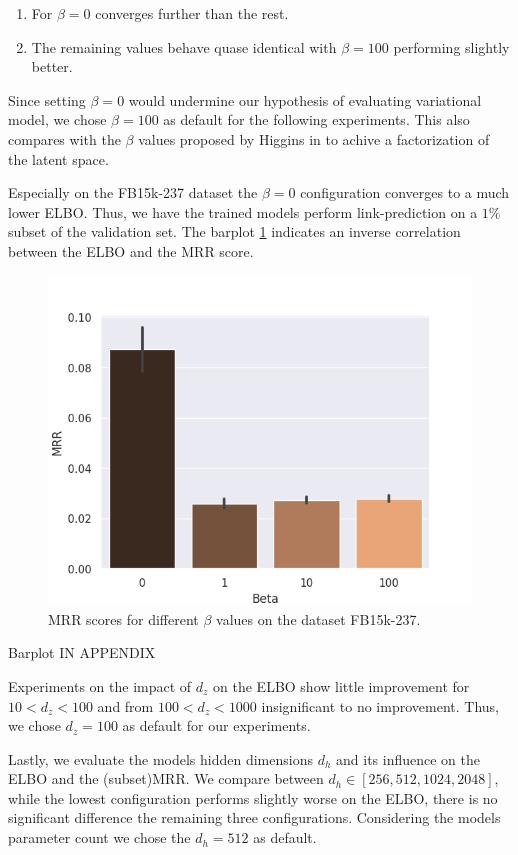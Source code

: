 \begin{enumerate}
    \item For $\beta = 0$ converges further than the rest.
    \item The remaining values behave quase identical with $\beta = 100$ performing slightly better. 
\end{enumerate}

Since setting $\beta = 0$ would undermine our hypothesis of evaluating variational model, we chose $\beta = 100$ as default for the following experiments. This also compares with the $\beta$ values proposed by Higgins in \cite{higgins_beta-vae_2016} to achive a factorization of the latent space.

Especially on the FB15k-237 dataset the $\beta = 0$ configuration converges to a much lower ELBO. Thus, we have the trained models perform link-prediction on a $1\%$ subset of the validation set. The barplot \ref{fig5:betafbmrr} indicates an inverse correlation between the ELBO and the MRR score. 

\begin{figure}[H]
    \centering
      \includegraphics[width=.45\textwidth]{graphs/plots/beta_mrr_fb.png}
      \caption{MRR scores for different $\beta$ values on the dataset FB15k-237.}
      \label{fig5:betafbmrr}
\end{figure}

Barplot IN APPENDIX  

Experiments on the impact of $d_z$ on the ELBO show little improvement for $10<d_z<100$ and from $100<d_z<1000$ insignificant to no improvement. Thus, we chose $d_z=100$ as default for our experiments.


Lastly, we evaluate the models hidden dimensions $d_h$ and its influence on the ELBO and the (subset)MRR. We compare between $d_h\in [256, 512, 1024, 2048]$, while the lowest configuration performs slightly worse on the ELBO, there is no significant difference the remaining three configurations. Considering the models parameter count we chose the $d_h=512$ as default.


